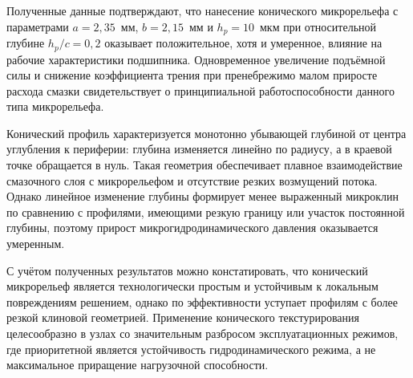 Полученные данные подтверждают, что нанесение конического микрорельефа с параметрами $a = 2{,}35$~мм, $b = 2{,}15$~мм и $h_p = 10$~мкм при относительной глубине $h_p/c = 0{,}2$ оказывает положительное, хотя и умеренное, влияние на рабочие характеристики подшипника. Одновременное увеличение подъёмной силы и снижение коэффициента трения при пренебрежимо малом приросте расхода смазки свидетельствует о принципиальной работоспособности данного типа микрорельефа.

Конический профиль характеризуется монотонно убывающей глубиной от центра углубления к периферии: глубина изменяется линейно по радиусу, а в краевой точке обращается в нуль. Такая геометрия обеспечивает плавное взаимодействие смазочного слоя с микрорельефом и отсутствие резких возмущений потока. Однако линейное изменение глубины формирует менее выраженный микроклин по сравнению с профилями, имеющими резкую границу или участок постоянной глубины, поэтому прирост микрогидродинамического давления оказывается умеренным.

С учётом полученных результатов можно констатировать, что конический микрорельеф является технологически простым и устойчивым к локальным повреждениям решением, однако по эффективности уступает профилям с более резкой клиновой геометрией. Применение конического текстурирования целесообразно в узлах со значительным разбросом эксплуатационных режимов, где приоритетной является устойчивость гидродинамического режима, а не максимальное приращение нагрузочной способности.
